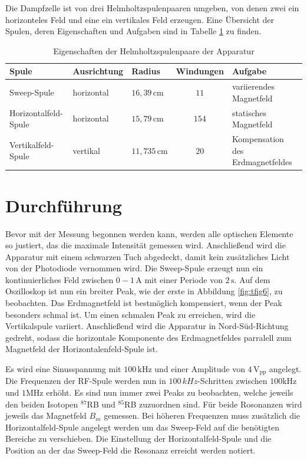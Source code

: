 Die Dampfzelle ist von drei Helmholtzspulenpaaren umgeben, von denen zwei ein horizonteles Feld und eine ein vertikales Feld erzeugen.
Eine Übersicht der Spulen, deren Eigenschaften und Aufgaben sind in Tabelle \ref{tab:ttab1} zu finden.
\FloatBarrier
\begin{table}[h]
    \centering
    \caption{Eigenschaften der Helmholtzspulenpaare der Apparatur}
    \label{tab:ttab1}
    \begin{tabular}{l l l c l}
        \toprule
        {Spule} & {Ausrichtung} & {Radius} & {Windungen} & {Aufgabe} \\
        \midrule
        Sweep-Spule & horizontal & $16,39\,\si{\cm}$ & $11$ & variierendes Magnetfeld\\
        Horizontalfeld-Spule & horizontal & $15,79\,\si{\cm}$ & $154$ & statisches Magnetfeld\\
        Vertikalfeld-Spule & vertikal & $11,735\,\si{\cm}$ & $20$ & Kompensation des Erdmagnetfeldes\\
        \bottomrule
    \end{tabular}
\end{table}
\FloatBarrier
\noindent


\section{Durchführung}
Bevor mit der Messung begonnen werden kann, werden alle optischen Elemente so justiert, das die maximale Intensität gemessen wird.
Anschließend wird die Apparatur mit einem schwarzen Tuch abgedeckt, damit kein zusätzliches Licht von der Photodiode vernommen wird.
Die Sweep-Spule erzeugt nun ein kontinuierliches Feld zwischen $0-1\,\si{\A}$ mit einer Periode von $2\,\si{\s}$.
Auf dem Oszilloskop ist nun ein breiter Peak, wie der erste in Abbildung \ref{fig:tfig6}, zu beobachten.
Das Erdmagnetfeld ist bestmöglich kompensiert, wenn der Peak besonders schmal ist.
Um einen schmalen Peak zu erreichen, wird die Vertikalspule variiert.
Anschließend wird die Apparatur in Nord-Süd-Richtung gedreht, sodass die horizontale Komponente des Erdmagnetfeldes parralell zum Magnetfeld der Horizontalenfeld-Spule ist.

Es wird eine Sinusspannung mit $100\,\si{\kHz}$ und einer Amplitude von $4\,\text{V}_{\text{pp}}$ angelegt.
Die Frequenzen der RF-Spule werden nun in $100\,\si{kHz}$-Schritten zwischen $100\si{\kHz}$ und $1\si{\MHz}$ erhöht.
Es sind nun immer zwei Peaks zu beobachten, welche jeweils den beiden Isotopen $^{87}$RB und $^{85}$RB zuzuordnen sind.
Für beide Rosonanzen wird jeweils das Magnetfeld $B_m$ gemessen.
Bei höheren Frequenzen muss zusätzlich die Horizontalfeld-Spule angelegt werden um das Sweep-Feld auf die benötigten Bereiche zu verschieben.
Die Einstellung der Horizontalfeld-Spule und die Position an der das Sweep-Feld die Resonanz erreicht werden notiert.


